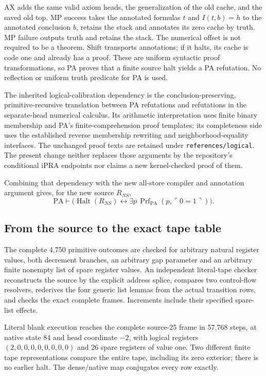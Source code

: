 AX adds the same valid axiom heads, the generalization of the old cache,
and the saved old top. MP success takes the annotated formulas $t$ and
$I(t,b)=h$ to the annotated conclusion $b$, retains the stack and annotates
its zero cache by truth. MP failure outputs truth and retains the stack.
The numerical offset is not required to be a theorem. Shift transports
annotations; if it halts, its cache is code one and already has a proof.
These are uniform syntactic proof transformations, so PA proves that a
finite source halt yields a PA refutation. No reflection or uniform truth
predicate for PA is used.

The inherited logical-calibration dependency is the conclusion-preserving,
primitive-recursive translation between PA refutations and refutations in
the separate-head numerical calculus. Its arithmetic interpretation uses
finite binary membership and PA's finite-comprehension proof templates;
its completeness side uses the established reverse membership rewriting
and neighborhood-equality interfaces. The unchanged proof texts are
retained under \texttt{references/logical}. The present change neither
replaces those arguments by the repository's conditional iPRA endpoints
nor claims a new kernel-checked proof of them.

Combining that dependency with the new all-store compiler and annotation
argument gives, for the new source $R_{NS}$,
\[
 \mathrm{PA}\vdash
 \bigl(\operatorname{Halt}(R_{NS})\leftrightarrow
       \exists p\,\operatorname{Prf}_{\mathrm{PA}}
                           (p,\ulcorner0=1\urcorner)\bigr).
\]

\subsection{From the source to the exact tape table}

The complete 4,750 primitive outcomes are checked for arbitrary natural
register values, both decrement branches, an arbitrary gap parameter and
an arbitrary finite nonempty list of spare register values. An independent
literal-tape checker reconstructs the source by the explicit address
splice, compares two control-flow resolvers, rederives the four generic
list lemmas from the actual transition rows, and checks the exact complete
frames. Increments include their specified spare-list effects.

Literal blank execution reaches the complete source-25 frame in 57,768
steps, at native state 84 and head coordinate $-2$, with logical registers
$(2,0,0,0,0,0,0,0,0)$ and 26 spare registers of value one. Two different
finite tape representations compare the entire tape, including its zero
exterior; there is no earlier halt. The dense/native map conjugates every
row exactly.

